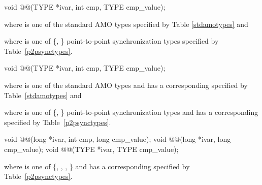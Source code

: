 
\begin{apidefinition}

\begin{C11synopsis}
void @@(TYPE *ivar, int cmp, TYPE cmp_value);
\end{C11synopsis}
where \TYPE{} is one of the standard \ac{AMO} types specified by
Table \ref{stdamotypes} and
\begin{DeprecateBlock}
where \TYPE{} is one of \{, \}
point-to-point synchronization types
specified by Table~\ref{p2psynctypes}.
\end{DeprecateBlock}

\begin{Csynopsis}
void @@(TYPE *ivar, int cmp, TYPE cmp_value);
\end{Csynopsis}
where \TYPE{} is one of the standard \ac{AMO} types and has a
corresponding \TYPENAME{} specified by Table~\ref{stdamotypes} and
\begin{DeprecateBlock}
where \TYPE{} is one of \{, \}
point-to-point synchronization types and has a
corresponding \TYPENAME{} specified by Table~\ref{p2psynctypes}.
\end{DeprecateBlock}

\begin{DeprecateBlock}
\begin{CsynopsisCol}
void @@(long *ivar, int cmp, long cmp_value);
void @@(long *ivar, long cmp_value);
void @@(TYPE *ivar, TYPE cmp_value);
\end{CsynopsisCol}
where \TYPE{} is one of \{, , ,
\} and has a corresponding \TYPENAME{} specified by
Table~\ref{p2psynctypes}.
\end{DeprecateBlock}

\begin{apiarguments}



\end{apiarguments}
\end{apidefinition}
